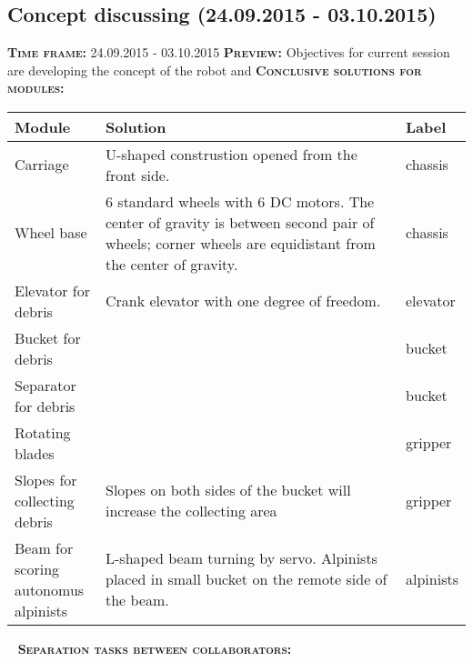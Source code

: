 \subsection{Concept discussing (24.09.2015 - 03.10.2015)}
	\textsc{\textbf{Time frame:}} 24.09.2015 - 03.10.2015 \newline
	\textsc{\textbf{Preview:}} Objectives for current session are developing the concept of the robot and  \newline \newline
	\textsc{\textbf{Conclusive solutions for modules:}}
	
	\begin{table}[H]
		\vspace{-2mm}
		\begin{center}
			\begin{tabular}{|p{0.2\linewidth}|p{0.7\linewidth}|p{0.1\linewidth}|}
				\hline
				Module & Solution & Label \\
				\hline
				Carriage & U-shaped construstion opened from the front side. & chassis \\
				\hline
				Wheel base & 6 standard wheels with 6 DC motors. The center of gravity is between second pair of wheels; corner wheels are equidistant from the center of gravity. & chassis \\
				\hline
				Elevator for debris & Crank elevator with one degree of freedom. & elevator \\
				\hline
				Bucket for debris &  & bucket \\
				\hline
				Separator for debris &  & bucket \\
				\hline
				Rotating blades &  & gripper \\
				\hline
				Slopes for collecting debris & Slopes on both sides of the bucket will increase the collecting area & gripper \\
				\hline
				Beam for scoring autonomus alpinists & L-shaped beam turning by servo. Alpinists placed in small bucket on the remote side of the beam. & alpinists \\
				\hline
			\end{tabular}
		\end{center}
	\end{table}
	\vspace{-10mm}
	 \newline
	\textsc{\textbf{Separation tasks between collaborators:}}
	
